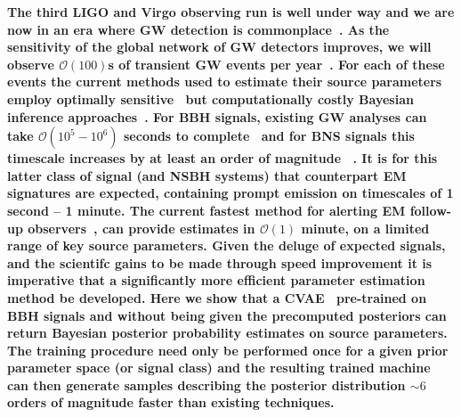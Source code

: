 \documentclass[%
showpacs,
 amsmath,amssymb,
 aps,
 twocolumn,
 prl,
 reprint,
floatfix,
]{revtex4-1}
\begin{document}
%
%
%
\textbf{ 
%
%
The third \ac{LIGO} and Virgo observing run is well under way and we are now in
an era where \ac{GW} detection is commonplace~\cite{PhysRevLett.116.061102,
PhysRevX.6.041015,PhysRevLett.119.161101}. As the sensitivity of the global
network of \ac{GW} detectors improves, we will observe $\mathcal{O}(100)$s of
transient \ac{GW} events per year~\cite{1409.7215}. For each of these events
the current methods used to estimate their source parameters employ optimally
sensitive~\cite{2009CQGra..26o5017S} but computationally costly Bayesian inference
approaches~\cite{1409.7215}.
%
%
For \ac{BBH} signals, existing \ac{GW} analyses can take $\mathcal{O}(10^{5} -
10^{6})$ seconds to complete~\cite{1409.7215} and for \ac{BNS}
signals this timescale increases by at least an order of magnitude
~\cite{PhysRevLett.119.161101}. It is for this latter class of signal (and
\ac{NSBH} systems) that counterpart \ac{EM} signatures are expected, containing
prompt emission on timescales of 1 second -- 1 minute. The current fastest
method for alerting \ac{EM} follow-up observers~\cite{2016PhRvD..93b4013S}, can
provide estimates in $\mathcal{O}(1)$ minute, on a limited range of key source
parameters. Given the deluge of expected signals, and the scientifc gains to be
made through speed improvement it is imperative that a significantly more
efficient parameter estimation method be developed.
%
%
Here we show that a \ac{CVAE}~\cite{1904.06264,1812.04405} pre-trained on
\ac{BBH} signals and without being given the precomputed posteriors can return
Bayesian posterior probability estimates on source parameters. The training
procedure need only be performed once for a given prior parameter space (or
signal class) and the resulting trained machine can then generate samples
describing the posterior distribution $\sim 6$ orders of magnitude faster than
existing techniques.}
\end{document}
